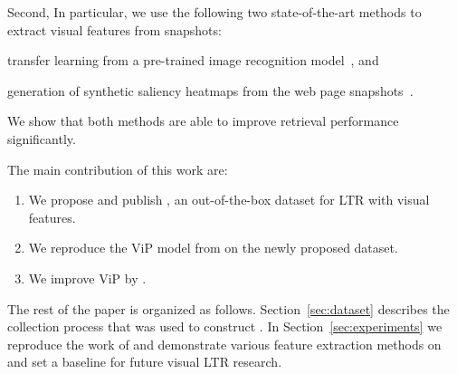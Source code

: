 Second, 
In particular, we use the following two state-of-the-art methods to extract visual features from snapshots:
\begin{inparaenum}[(i)]
\item transfer learning from a pre-trained image recognition model~\cite{donahue2014decaf,simonyan2014very}, and
\item generation of synthetic saliency heatmaps from the web page snapshots~\cite{shen2014webpage,shan2017two}.
\end{inparaenum}
We show that both methods are able to improve retrieval performance significantly.

The main contribution of this work are:
\begin{enumerate}  
\item We propose and publish \datasetname, an out-of-the-box dataset for \ac{LTR} with visual features.
\item We reproduce the ViP model from \cite{fan2017learning} on the newly proposed dataset.
\item We improve ViP by .
\end{enumerate}

 The rest of the paper is organized as follows. Section~\ref{sec:dataset} describes the collection process that was used to construct \datasetname. In Section~\ref{sec:experiments} we reproduce the work of \citet{fan2017learning} and demonstrate various feature extraction methods on \datasetname and set a baseline for future visual \ac{LTR} research.  